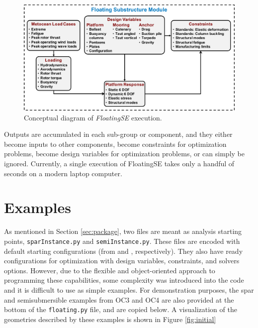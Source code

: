 \begin{figure}[htb]
  \begin{center}
    \includegraphics[width=5in]{figs/floatingse.pdf}
    \caption{Conceptual diagram of \textit{FloatingSE} execution.}
    \label{fig:floatingse}
  \end{center}
\end{figure}

Outputs are accumulated in each sub-group or component,
and they either become inputs to other components, become constraints
for optimization problems, become design variables for optimization
problems, or can simply be ignored.  Currently, a single execution of
FloatingSE takes only a handful of seconds on a modern laptop computer.


\section{Examples}
As mentioned in Section \ref{sec:package}, two files are meant as
analysis starting points, \texttt{sparInstance.py} and
\texttt{semiInstance.py}.  These files are encoded with default starting
configurations (from \citet{OC3} and \citet{OC4}, respectively).  They
also have ready configurations for optimization with design variables,
constraints, and solvers options.  However, due to the flexible and
object-oriented approach to programming these capabilities, some
complexity was introduced into the code and it is difficult to use as
simple examples.  For demonstration purposes, the spar and
semisubmersible examples from OC3 and OC4 are also provided at the
bottom of the \texttt{floating.py} file, and are copied below.  A
visualization of the geometries described by these examples is shown in
Figure \ref{fig:initial}

